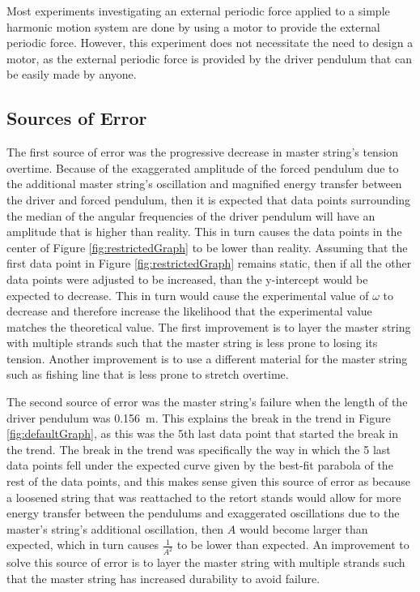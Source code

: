 \documentclass[letterpaper, 12pt]{article}
\begin{document}
Most experiments investigating an external periodic
force applied to a simple harmonic motion system
are done by using a motor to provide the external
periodic force. However, this experiment does
not necessitate the need to design a motor, as
the external periodic force is provided by
the driver pendulum that can be easily
made by anyone.

\subsection{Sources of Error}

The first source of error was the progressive decrease
in master string's tension overtime. Because of the
exaggerated amplitude of the forced pendulum
due to the additional master string's oscillation
and magnified energy transfer between the driver
and forced pendulum,
then it is expected that data points surrounding
the median of the angular frequencies of the driver
pendulum will have an amplitude that is higher
than reality. This in turn causes the
data points in the center of Figure \ref*{fig:restrictedGraph}
to be lower than reality. Assuming that the first
data point in Figure \ref*{fig:restrictedGraph}
remains static, then if all the other data points
were adjusted to be increased, than the y-intercept
would be expected to decrease. This in turn would
cause the experimental value of \(\omega\) to decrease
and therefore increase the likelihood that
the experimental value matches the theoretical value.
The first improvement is to layer the master string
with multiple strands such that the master string
is less prone to losing its tension. Another
improvement is to use a different material
for the master string such as fishing line
that is less prone to stretch overtime.

The second source of error was the master string's failure
when the length of the driver pendulum was \SI{0.156}{m}.
This explains the break in the trend in Figure \ref*{fig:defaultGraph},
as this was the 5th last data point that started the
break in the trend. The break in the trend was specifically
the way in which the 5 last data points fell under
the expected curve given by the best-fit parabola
of the rest of the data points, and this makes
sense given this source of error as because a loosened
string that was reattached to the retort stands
would allow for more energy transfer between the
pendulums and exaggerated oscillations due to the
master's string's additional oscillation, then
\(A\) would become larger than expected,
which in turn causes \(\frac{1}{A^2}\)
to be lower than expected. An improvement
to solve this source of error is to layer
the master string with multiple strands such
that the master string has increased durability
to avoid failure.
\end{document}
